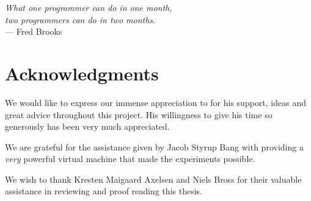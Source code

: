 
\begin{flushright}{\slshape    
   What one programmer can do in one month,\\
   two programmers can do in two months.} \\ \medskip
    --- Fred Brooks
\end{flushright}

\bigskip

\begingroup
\let\clearpage\relax
\let\cleardoublepage\relax
\let\cleardoublepage\relax
\chapter*{Acknowledgments}
We would like to express our immense appreciation to \myProf for his support, ideas and great advice throughout this project. His willingness to give his time so generously has been very much appreciated.


\bigskip

We are grateful for the assistance given by Jacob Styrup Bang with providing a \emph{very} powerful virtual machine that made the experiments possible.

\bigskip

We wish to thank
Kresten Maigaard Axelsen
and
Niels Bross
for their valuable assistance in reviewing and proof reading this thesis.

\endgroup



